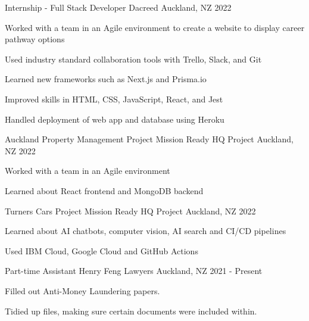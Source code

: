 

\begin{cventries}
\cventry
{Internship - Full Stack Developer} %
{Dacreed} %
{Auckland, NZ} %
{2022} %
{
  \begin{cvitems} %
    \item {Worked with a team in an Agile environment to create a website to display career pathway options}
    \item {Used industry standard collaboration tools with Trello, Slack, and Git}
    \item {Learned new frameworks such as Next.js and Prisma.io}
    \item {Improved skills in HTML, CSS, JavaScript, React, and Jest}
    \item {Handled deployment of web app and database using Heroku}
  \end{cvitems}
}

\cventry
{Auckland Property Management Project} %
{Mission Ready HQ Project} %
{Auckland, NZ} %
{2022} %
{
  \begin{cvitems} %
    \item {Worked with a team in an Agile environment}
    \item {Learned about React frontend and MongoDB backend}
  \end{cvitems}
}

\cventry
{Turners Cars Project} %
{Mission Ready HQ Project} %
{Auckland, NZ} %
{2022} %
{
  \begin{cvitems} %
    \item {Learned about AI chatbots, computer vision, AI search and CI/CD pipelines}
    \item {Used IBM Cloud, Google Cloud and GitHub Actions}
  \end{cvitems}
}

  \cventry
    {Part-time Assistant} %
    {Henry Feng Lawyers} %
    {Auckland, NZ} %
    {2021 - Present} %
    {
      \begin{cvitems} %
        \item {Filled out Anti-Money Laundering papers.}
        \item {Tidied up files, making sure certain documents were included within.}
      \end{cvitems}
    }


\end{cventries}
